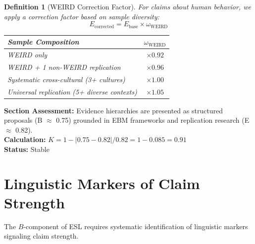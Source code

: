 \documentclass[11pt,a4paper]{article}
\newtheorem{definition}{Definition}[section]
\begin{document}
\begin{definition}[WEIRD Correction Factor]
\label{def:weird}
For claims about human behavior, we apply a correction factor based on sample diversity:
\begin{equation}
E_{\text{corrected}} = E_{\text{base}} \times \omega_{\text{WEIRD}}
\end{equation}
\begin{center}
\begin{tabular}{lc}
\toprule
\textbf{Sample Composition} & $\omega_{\text{WEIRD}}$ \\
\midrule
WEIRD only & $\times 0.92$ \\
WEIRD + 1 non-WEIRD replication & $\times 0.96$ \\
Systematic cross-cultural (3+ cultures) & $\times 1.00$ \\
Universal replication (5+ diverse contexts) & $\times 1.05$ \\
\bottomrule
\end{tabular}
\end{center}
\end{definition}

\begin{eslbox}
\textbf{Section Assessment:} Evidence hierarchies are presented as structured proposals (B $\approx$ 0.75) grounded in EBM frameworks and replication research (E $\approx$ 0.82). \\[0.3em]
\textbf{Calculation:} $K = 1 - |0.75 - 0.82| / 0.82 = 1 - 0.085 = 0.91$ \\
\textbf{Status:} Stable
\end{eslbox}

\section{Linguistic Markers of Claim Strength}
\label{sec:linguistic}


The $B$-component of ESL requires systematic identification of linguistic markers signaling claim strength.
\end{document}
